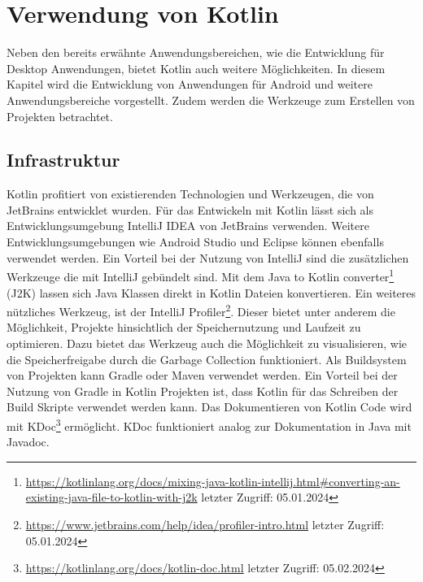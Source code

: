 \documentclass{article}
\begin{document}
\section{Verwendung von Kotlin}
Neben den bereits erwähnte Anwendungsbereichen, wie die Entwicklung für Desktop Anwendungen, bietet Kotlin auch weitere Möglichkeiten. In diesem Kapitel wird die Entwicklung von Anwendungen für Android und weitere Anwendungsbereiche vorgestellt. Zudem werden die Werkzeuge zum Erstellen von Projekten betrachtet.

\subsection{Infrastruktur}
Kotlin profitiert von existierenden Technologien und Werkzeugen, die von JetBrains entwicklet wurden. Für das Entwickeln mit Kotlin lässt sich als Entwicklungsumgebung IntelliJ IDEA von JetBrains verwenden. Weitere Entwicklungsumgebungen wie Android Studio und Eclipse können ebenfalls verwendet werden. Ein Vorteil bei der Nutzung von IntelliJ sind die zusätzlichen Werkzeuge die mit IntelliJ gebündelt sind. Mit dem Java to Kotlin converter\footnote{\url{https://kotlinlang.org/docs/mixing-java-kotlin-intellij.html#converting-an-existing-java-file-to-kotlin-with-j2k} letzter Zugriff: 05.01.2024} (J2K) lassen sich Java Klassen direkt in Kotlin Dateien konvertieren. Ein weiteres nützliches Werkzeug, ist der IntelliJ Profiler\footnote{\url{https://www.jetbrains.com/help/idea/profiler-intro.html} letzter Zugriff: 05.01.2024}. Dieser bietet unter anderem die Möglichkeit, Projekte hinsichtlich der Speichernutzung und Laufzeit zu optimieren. Dazu bietet das Werkzeug auch die Möglichkeit zu visualisieren, wie die Speicherfreigabe durch die Garbage Collection funktioniert. \newline
Als Buildsystem von Projekten kann Gradle oder Maven verwendet werden. Ein Vorteil bei der Nutzung von Gradle in Kotlin Projekten ist, dass Kotlin für das Schreiben der Build Skripte verwendet werden kann. Das Dokumentieren von Kotlin Code wird mit KDoc\footnote{\url{https://kotlinlang.org/docs/kotlin-doc.html} letzter Zugriff: 05.02.2024} ermöglicht. KDoc funktioniert analog zur Dokumentation in Java mit Javadoc.
\end{document}
